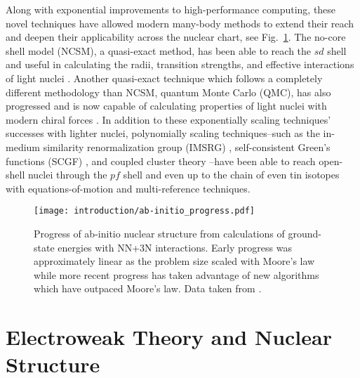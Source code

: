 \documentclass[../thesis.tex]{subfiles}
\begin{document}
Along with exponential improvements to high-performance computing, these novel techniques have allowed modern many-body methods to extend their reach and deepen their applicability across the nuclear chart, see Fig.\ \ref{fig:AbInitioProgress}.  The no-core shell model (NCSM), a quasi-exact method, has been able to reach the $sd$ shell and useful in calculating the radii, transition strengths, and effective interactions of light nuclei \cite{NAVRATIL2000054311,NAVRATIL2009083101,BARRETT2013131}.  Another quasi-exact technique which follows a completely different methodology than NCSM, quantum Monte Carlo (QMC), has also progressed and is now capable of calculating properties of light nuclei with modern chiral forces \cite{PUDLINER19971720,PIEPER200153,CARLSON20151067}.  In addition to these exponentially scaling techniques' successes with lighter nuclei, polynomially scaling techniques--such as the in-medium similarity renormalization group (IMSRG) \cite{TSUKIYAMA2011222502,TSUKIYAMA2012061304,HERGERT2013242501,BOGNER2014142501,HERGERT2014041302,HERGERT2017023002,STROBERG2016051301,STROBERG2017032502}, self-consistent Green's functions (SCGF) \cite{SOMA2013011303,SOMA2014024323,SOMA2014061301}, and coupled cluster theory \cite{WLOCH2005212501,WLOCH2005S1291,JANSEN2014142502,JANSEN2016011301,HAGEN2015186,KOWALSKI2004132501,GOUR2006024310,BINDER2013054319}--have been able to reach open-shell nuclei through the $pf$ shell and even up to the chain of even tin isotopes with equations-of-motion and multi-reference techniques.  

\begin{figure}[h]
  \centering
  \texttt{[image: introduction/ab-initio\_progress.pdf]}
  \caption{Progress of ab-initio nuclear structure from calculations of ground-state energies with NN+3N interactions.  Early progress was approximately linear as the problem size scaled with Moore's law while more recent progress has taken advantage of new algorithms which have outpaced Moore's law.  Data taken from \cite{HERGERTPRIVATE}.}
  \label{fig:AbInitioProgress}
\end{figure}


\section{Electroweak Theory and Nuclear Structure}
\end{document}
